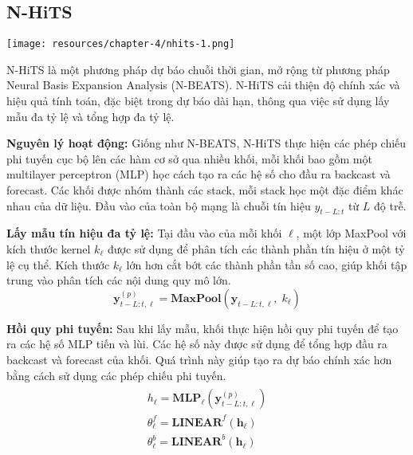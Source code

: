 \subsection{N-HiTS}
\begin{minipage}{0.45\textwidth}
\centering
\texttt{[image: resources/chapter-4/nhits-1.png]}
\end{minipage}

N-HiTS là một phương pháp dự báo chuỗi thời gian, mở rộng từ phương pháp Neural Basis Expansion Analysis (N-BEATS). N-HiTS cải thiện độ chính xác và hiệu quả tính toán, đặc biệt trong dự báo dài hạn, thông qua việc sử dụng lấy mẫu đa tỷ lệ và tổng hợp đa tỷ lệ.

\textbf{Nguyên lý hoạt động:}
Giống như N-BEATS, N-HiTS thực hiện các phép chiếu phi tuyến cục bộ lên các hàm cơ sở qua nhiều khối, mỗi khối bao gồm một multilayer perceptron (MLP) học cách tạo ra các hệ số cho đầu ra backcast và forecast. Các khối được nhóm thành các stack, mỗi stack học một đặc điểm khác nhau của dữ liệu. Đầu vào của toàn bộ mạng là chuỗi tín hiệu \(y_{t-L:t}\) từ \(L\) độ trễ.

\textbf{Lấy mẫu tín hiệu đa tỷ lệ:}
Tại đầu vào của mỗi khối \(\ell\), một lớp MaxPool với kích thước kernel \(k_{\ell}\) được sử dụng để phân tích các thành phần tín hiệu ở một tỷ lệ cụ thể. Kích thước \(k_{\ell}\) lớn hơn cắt bớt các thành phần tần số cao, giúp khối tập trung vào phân tích các nội dung quy mô lớn.
\[\mathbf{y}^{(p)}_{t-L:t, \ell} = \mathbf{MaxPool}\left(\mathbf{y}_{t-L:t, \ell},\; k_{\ell}\right)\]

\textbf{Hồi quy phi tuyến:}
Sau khi lấy mẫu, khối thực hiện hồi quy phi tuyến để tạo ra các hệ số MLP tiến và lùi. Các hệ số này được sử dụng để tổng hợp đầu ra backcast và forecast của khối. Quá trình này giúp tạo ra dự báo chính xác hơn bằng cách sử dụng các phép chiếu phi tuyến.
\begin{align*}
\begin{split}
    {h}_{\ell} = \mathbf{MLP}_{\ell}\left(\mathbf{y}^{(p)}_{t-L:t,\ell}\right)\\
    \theta^{f}_{\ell} = \textbf{LINEAR}^{f}\left(\mathbf{h}_{\ell}\right)\\
    \theta^{b}_{\ell} = \textbf{LINEAR}^{b}\left(\mathbf{h}_{\ell}\right)
\end{split}
\end{align*}

